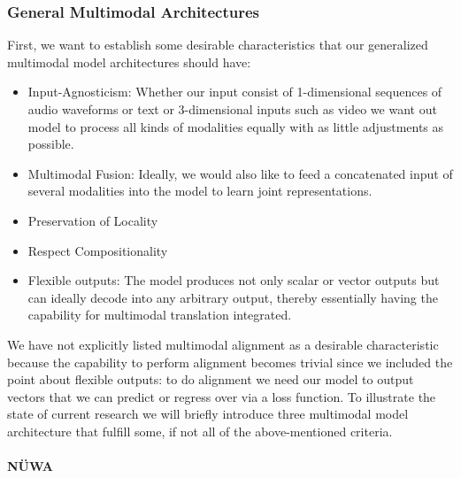 \documentclass[
]{krantz}
\providecommand{\tightlist}{%
  \setlength{\itemsep}{0pt}\setlength{\parskip}{0pt}}
\begin{document}
\hypertarget{general-multimodal-architectures}{%
\subsubsection{General Multimodal Architectures}\label{general-multimodal-architectures}}

First, we want to establish some desirable characteristics that our generalized multimodal model architectures should have:

\begin{itemize}
\tightlist
\item
  Input-Agnosticism: Whether our input consist of 1-dimensional sequences of audio waveforms or text or 3-dimensional inputs such as video we want out model to process all kinds of modalities equally with as little adjustments as possible.
\item
  Multimodal Fusion: Ideally, we would also like to feed a concatenated input of several modalities into the model to learn joint representations.
\item
  Preservation of Locality
\item
  Respect Compositionality
\item
  Flexible outputs: The model produces not only scalar or vector outputs but can ideally decode into any arbitrary output, thereby essentially having the capability for multimodal translation integrated.
\end{itemize}

We have not explicitly listed multimodal alignment as a desirable characteristic because the capability to perform alignment becomes trivial since we included the point about flexible outputs: to do alignment we need our model to output vectors that we can predict or regress over via a loss function.
To illustrate the state of current research we will briefly introduce three multimodal model architecture that fulfill some, if not all of the above-mentioned criteria.

\hypertarget{nuxfcwa}{%
\paragraph{NÜWA}\label{nuxfcwa}}
\end{document}
